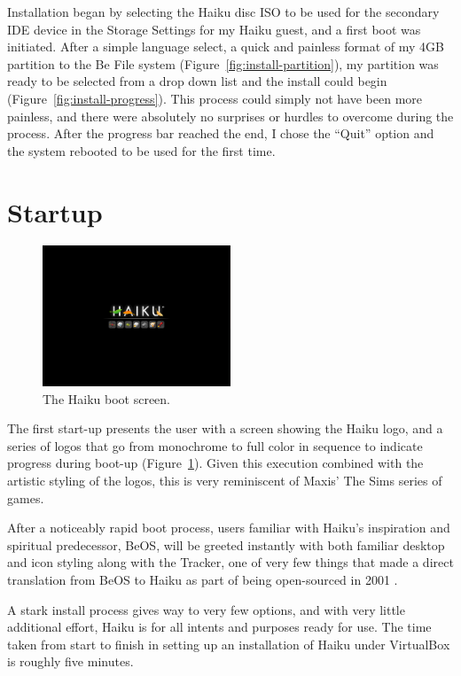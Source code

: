 \documentclass{article}
\newcommand{\figref}[1]{Figure~\ref{fig:#1}}
\begin{document}
Installation began by selecting the Haiku disc ISO to be used for the
secondary IDE device in the Storage Settings for my Haiku guest, and a
first boot was initiated.  After a simple language select, a quick and
painless format of my 4GB partition to the Be File system
(\figref{install-partition}), my partition was ready to be selected
from a drop down list and the install could begin
(\figref{install-progress}).  This process could simply not have been
more painless, and there were absolutely no surprises or hurdles to
overcome during the process.  After the progress bar reached the end,
I chose the ``Quit'' option and the system rebooted to be used for the
first time.

\section{Startup}

\begin{figure}[h]
\centering
\includegraphics[width=0.5\textwidth]{figs/startup.png}
\caption{The Haiku boot screen.}
\label{fig:startup}
\end{figure}

The first start-up presents the user with a screen showing the Haiku
logo, and a series of logos that go from monochrome to full color in
sequence to indicate progress during boot-up (\figref{startup}).
Given this execution combined with the artistic styling of the logos,
this is very reminiscent of Maxis' The Sims series of games.

After a noticeably rapid boot process, users familiar with
Haiku's inspiration and spiritual predecessor, BeOS, will be greeted 
instantly with both familiar desktop and icon styling along with the
Tracker, one of very few things that made a direct translation from
BeOS to Haiku as part of being open-sourced in 2001 \cite{HaikuFaq}.

A stark install process gives way to very few options, and with very little
additional effort, Haiku is for all intents and purposes ready for use.  
The time taken from start to finish in setting up an installation of Haiku under
VirtualBox is roughly five minutes.
\end{document}

